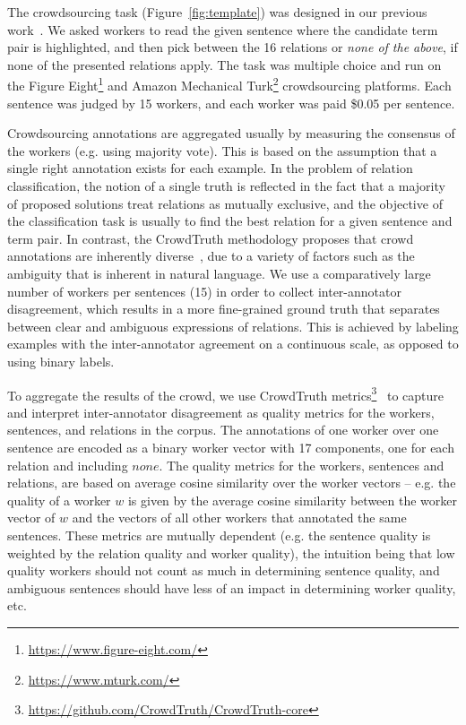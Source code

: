 The crowdsourcing task (Figure~\ref{fig:template}) was designed in our previous work~\cite{dumitrache2017false}. We asked workers to read the given sentence where the candidate term pair is highlighted, and then pick between the 16 relations or \textit{none of the above}, if none of the presented relations apply. The task was multiple choice and run on the Figure Eight\footnote{\url{https://www.figure-eight.com/}} and Amazon Mechanical Turk\footnote{\url{https://www.mturk.com/}} crowdsourcing platforms. Each sentence was judged by 15 workers, and each worker was paid \$0.05 per sentence. 

Crowdsourcing annotations are aggregated usually by measuring the consensus of the workers (e.g. using majority vote). This is based on the assumption that a single right annotation exists for each example. In the problem of relation classification, the notion of a single truth is reflected in the fact that a majority of proposed solutions treat relations as mutually exclusive, and the objective of the classification task is usually to find the best relation for a given sentence and term pair. In contrast, the CrowdTruth methodology proposes that crowd annotations are inherently diverse~\cite{aroyo2015truth}, due to a variety of factors such as the ambiguity that is inherent in natural language. We use a comparatively large number of workers per sentences (15) in order to collect inter-annotator disagreement, which results in a more fine-grained ground truth that separates between clear and ambiguous expressions of relations. This is achieved by labeling examples with the inter-annotator agreement on a continuous scale, as opposed to using binary labels.

To aggregate the results of the crowd, we use CrowdTruth metrics\footnote{\url{https://github.com/CrowdTruth/CrowdTruth-core}}~\cite{dumitrache2018crowdtruth} to capture and interpret inter-annotator disagreement as quality metrics for the workers, sentences, and relations in the corpus. The annotations of one worker over one sentence are encoded as a binary worker vector with 17 components, one for each relation and including $none$. The quality metrics for the workers, sentences and relations, are based on average cosine similarity over the worker vectors --  e.g. the quality of a worker $w$ is given by the average cosine similarity between the worker vector of $w$ and the vectors of all other workers that annotated the same sentences. 
These metrics are mutually dependent (e.g. the sentence quality is weighted by the relation quality and worker quality), the intuition being that low quality workers should not count as much in determining sentence quality, and ambiguous sentences should have less of an impact in determining worker quality, etc.

